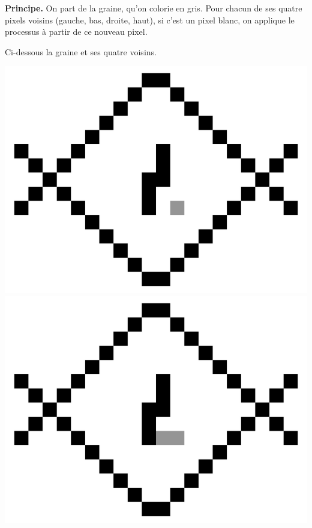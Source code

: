 \documentclass[11pt,class=report,crop=false]{standalone}
\begin{document}


\textbf{Principe.} On part de la graine, qu'on colorie en gris. Pour chacun de ses quatre pixels voisins (gauche, bas, droite, haut), si c'est un pixel blanc, on applique le processus à partir de ce nouveau pixel.

Ci-dessous la graine et ses quatre voisins.
\begin{center}
	\includegraphics[scale=\myscale,scale=0.15]{figures/fill01_000}\quad
	\includegraphics[scale=\myscale,scale=0.15]{figures/fill01_001}\quad

\end{center}
\end{document}
